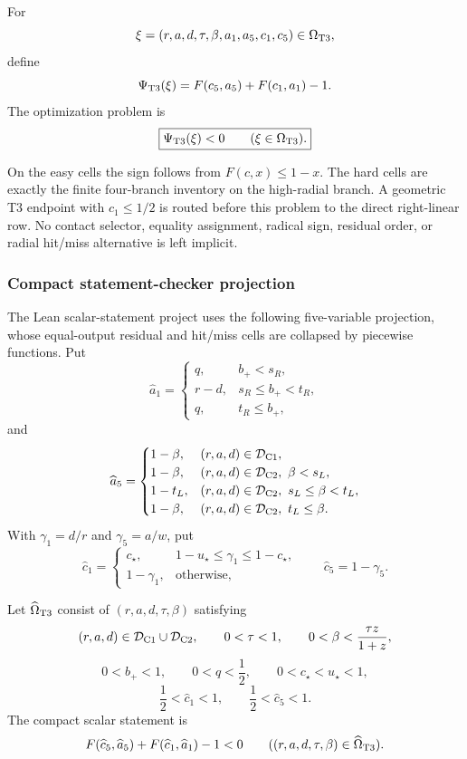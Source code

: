\begin{definition}[Problem S2-T3]
\label{prob:s2-t3-endpoint}
For
\[
 \xi=(r,a,d,\tau,\beta,a_1,a_5,c_1,c_5)\in\Omega_{\rm T3},
\]
define
\[
 \Psi_{\rm T3}(\xi)
 =F(c_5,a_5)+F(c_1,a_1)-1.
\]
The optimization problem is
\[
 \boxed{
 \Psi_{\rm T3}(\xi)<0
 \qquad
 (\xi\in\Omega_{\rm T3}).
 }
\]
\end{definition}

On the easy cells the sign follows from \(F(c,x)\le1-x\).  The hard cells
are exactly the finite four-branch inventory on the high-radial branch.  A
geometric T3 endpoint with \(c_1\le1/2\) is routed before this problem to the
direct right-linear row.  No contact selector, equality assignment, radical
sign, residual order, or radial hit/miss alternative is left implicit.

\subsubsection{Compact statement-checker projection}

The Lean scalar-statement project uses the following five-variable projection, whose
equal-output residual and hit/miss cells are collapsed by piecewise functions.
Put
\[
 \widehat a_1=
 \begin{cases}
 q,&b_+<s_R,\\
 r-d,&s_R\le b_+<t_R,\\
 q,&t_R\le b_+,
 \end{cases}
\]
and
\[
 \widehat a_5=
 \begin{cases}
 1-\beta,&(r,a,d)\in\mathcal D_{\rm C1},\\
 1-\beta,&(r,a,d)\in\mathcal D_{\rm C2},\ \beta<s_L,\\
 1-t_L,&(r,a,d)\in\mathcal D_{\rm C2},\ s_L\le\beta<t_L,\\
 1-\beta,&(r,a,d)\in\mathcal D_{\rm C2},\ t_L\le\beta.
 \end{cases}
\]
With \(\gamma_1=d/r\) and \(\gamma_5=a/w\), put
\[
 \widehat c_1=
 \begin{cases}
 c_\star,&1-u_\star\le\gamma_1\le1-c_\star,\\
 1-\gamma_1,&\text{otherwise},
 \end{cases}
 \qquad
 \widehat c_5=1-\gamma_5.
\]

\begin{definition}
\label{prob:s2-t3-compact-projection}
Let \(\widehat\Omega_{\rm T3}\) consist of
\((r,a,d,\tau,\beta)\) satisfying
\[
 (r,a,d)\in\mathcal D_{\rm C1}\cup\mathcal D_{\rm C2},
 \qquad 0<\tau<1,
 \qquad 0<\beta<\frac{\tau z}{1+z},
\]
\[
 0<b_+<1,\qquad
 0<q<\frac12,\qquad
 0<c_\star<u_\star<1,
\]
\[
 \frac12<\widehat c_1<1,
 \qquad
 \frac12<\widehat c_5<1.
\]
The compact scalar statement is
\[
 F(\widehat c_5,\widehat a_5)
 +F(\widehat c_1,\widehat a_1)-1<0
 \qquad
 ((r,a,d,\tau,\beta)\in\widehat\Omega_{\rm T3}).
\]
\end{definition}

